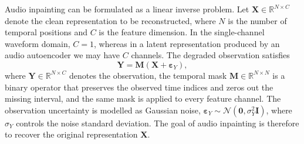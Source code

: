 \documentclass{article}
\begin{document}




Audio inpainting can be formulated as a linear inverse problem.
Let $\mathbf{X} \in \mathbb{R}^{N \times C}$ denote the clean representation to be reconstructed, where $N$ is the number of temporal positions and $C$ is the feature dimension.
In the single-channel waveform domain, $C=1$, whereas in a latent representation produced by an audio autoencoder we may have $C$ channels.
The degraded observation satisfies
\begin{equation}
    \mathbf{Y} = \mathbf{M}(\mathbf{X} + \boldsymbol{\varepsilon}_Y),
    \label{eq:inverse}
\end{equation}
where $\mathbf{Y} \in \mathbb{R}^{N \times C}$ denotes the observation, the temporal mask $\mathbf{M} \in \mathbb{R}^{N\times N}$ is a binary operator that preserves the observed time indices and zeros out the missing interval, and the same mask is applied to every feature channel.
The observation uncertainty is modelled as Gaussian noise, $\boldsymbol{\varepsilon}_Y \sim \mathcal{N}(\mathbf{0}, \sigma_Y^2 \mathbf{I})$, where $\sigma_Y$ controls the noise standard deviation.
The goal of audio inpainting is therefore to recover the original representation $\mathbf{X}$.



\end{document}
